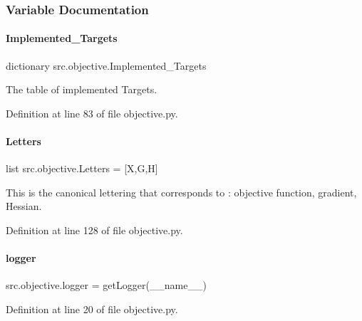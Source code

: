 \subsubsection{Variable Documentation}
\mbox{\label{namespacesrc_1_1objective_affc0db9b4e7c6a7a3fbc50a2dc9876d9}} 
\paragraph{\texorpdfstring{Implemented\+\_\+\+Targets}{Implemented\_Targets}}
{\footnotesize\ttfamily dictionary src.\+objective.\+Implemented\+\_\+\+Targets}



The table of implemented Targets. 



Definition at line 83 of file objective.\+py.

\mbox{\label{namespacesrc_1_1objective_ab535c4148fea4c974ca148174fdfeb93}} 
\paragraph{\texorpdfstring{Letters}{Letters}}
{\footnotesize\ttfamily list src.\+objective.\+Letters = \mbox{[}\textquotesingle{}X\textquotesingle{},\textquotesingle{}G\textquotesingle{},\textquotesingle{}H\textquotesingle{}\mbox{]}}



This is the canonical lettering that corresponds to \+: objective function, gradient, Hessian. 



Definition at line 128 of file objective.\+py.

\mbox{\label{namespacesrc_1_1objective_a2e1b3afb7e55f6f759956a7a80782862}} 
\paragraph{\texorpdfstring{logger}{logger}}
{\footnotesize\ttfamily src.\+objective.\+logger = get\+Logger(\+\_\+\+\_\+name\+\_\+\+\_\+)}



Definition at line 20 of file objective.\+py.

